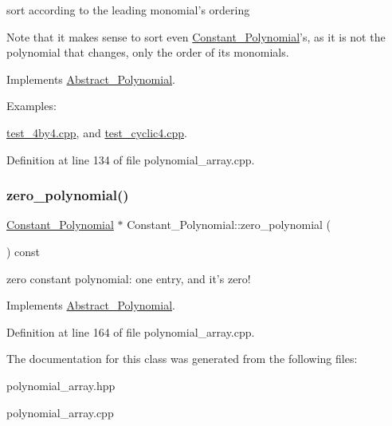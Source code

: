 sort according to the leading monomial's ordering 

Note that it makes sense to sort even \hyperlink{class_constant___polynomial}{Constant\+\_\+\+Polynomial}'s, as it is not the polynomial that changes, only the order of its monomials. 

Implements \hyperlink{class_abstract___polynomial_a1fcdd29c324c660ea935197c39e682f2}{Abstract\+\_\+\+Polynomial}.

\begin{Desc}
\item[Examples\+: ]\par
\hyperlink{test_4by4_8cpp-example}{test\+\_\+4by4.\+cpp}, and \hyperlink{test_cyclic4_8cpp-example}{test\+\_\+cyclic4.\+cpp}.\end{Desc}


Definition at line 134 of file polynomial\+\_\+array.\+cpp.

\mbox{\label{class_constant___polynomial_a9fa38fcf15c142679d4baade49fe4515}} 
\subsubsection{\texorpdfstring{zero\+\_\+polynomial()}{zero\_polynomial()}}
{\footnotesize\ttfamily \hyperlink{class_constant___polynomial}{Constant\+\_\+\+Polynomial} $\ast$ Constant\+\_\+\+Polynomial\+::zero\+\_\+polynomial (\begin{DoxyParamCaption}{ }\end{DoxyParamCaption}) const\hspace{0.3cm}{\ttfamily [virtual]}}

zero constant polynomial\+: one entry, and it's zero! 

Implements \hyperlink{class_abstract___polynomial_ab50acaac5654329c0299d5694a25b1ed}{Abstract\+\_\+\+Polynomial}.



Definition at line 164 of file polynomial\+\_\+array.\+cpp.



The documentation for this class was generated from the following files\+:\begin{DoxyCompactItemize}
\item 
polynomial\+\_\+array.\+hpp\item 
polynomial\+\_\+array.\+cpp\end{DoxyCompactItemize}
